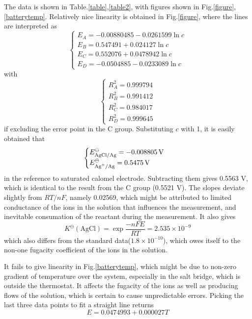 \documentclass[%
 reprint,
 amsmath,amssymb,
 aps,
10.5pt,
]{revtex4-1}
\begin{document}
The data is shown in Table.\ref{table},\ref{table2}, with figures shown in Fig.\ref{figure},\ref{batterytemp}. Relatively nice linearity is obtained in Fig.\ref{figure}, where the lines are interpreted as
\begin{equation}
\begin{cases}
E_A = -0.00880485 - 0.0261599 \ln{c} \\
E_B = 0.547491 + 0.024127 \ln{c} \\
E_C = 0.552076 + 0.0478942 \ln{c} \\
E_D = -0.0504885 - 0.0233089 \ln{c}
\end{cases}
\end{equation}
with
\begin{equation}
\begin{cases}
R^2_A = 0.999794 \\
R^2_B = 0.991412 \\
R^2_C = 0.984017 \\
R^2_D = 0.999645
\end{cases}
\end{equation}
if excluding the error point in the C group. Substituting $c$ with 1, it is easily obtained that
\begin{equation}
\begin{cases}
E^\ominus_\text{AgCl/Ag} = -0.008805 \, \mathrm{V} \\
E^\ominus_\text{\ce{Ag+}/Ag} = 0.5475 \, \mathrm{V} 
\end{cases}
\end{equation}
in the reference to saturated calomel electrode. Subtracting them gives 0.5563 V, which is identical to the result from the C group (0.5521 V). The slopes deviate slightly from $RT/nF$, namely 0.02569, which might be attributed to limited conductance of the ions in the solution that influences the measurement, and inevitable consumation of the reactant during the measurement. It also gives
\begin{equation}
K^\ominus(\text{AgCl}) = \exp{\frac{-nFE}{RT}} = 2.535 \times 10^{-9}
\end{equation}
which also differs from the standard data($1.8\times 10^{-10}$), which owes itself to the non-one fugacity coefficient of the ions in the solution. 

It fails to give linearity in Fig.\ref{batterytemp}, which might be due to non-zero gradient of temperature over the system, especially in the salt bridge, which is outside the thermostat. It affects the fugacity of the ions as well as producing flows of the solution, which is certain to cause unpredictable errors. Picking the last three data points to fit a straight line returns
\begin{equation}
E = 0.0474993 + 0.000027 T
\end{equation}
\end{document}
